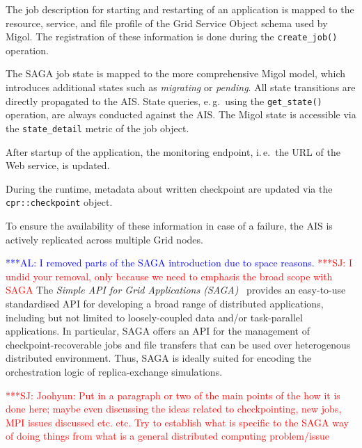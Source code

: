 \documentclass[times, 10pt, twocolumn]{article}
\newcommand{\alnote}[1]{ {\textcolor{blue} { ***AL: #1 }}}
\newcommand{\jhanote}[1]{ {\textcolor{red} { ***SJ: #1 }}}
\newcommand{\alnote}[1]{}
\newcommand{\jhanote}[1]{}
\newcommand{\up}{\vspace*{-1em}}
\begin{document}
\begin{compactitem}
\item The job description for starting and restarting of an
  application is mapped to the resource, service, and file profile of
  the Grid Service Object schema used by Migol. The registration of
  these information is done during the \texttt{create\_job()}
  operation.
\item The SAGA job state is mapped to the more comprehensive Migol
  model, which introduces additional states such as \emph{migrating}
  or \emph{pending}. All state transitions are directly propagated to
  the AIS. State queries, e.\,g.\ using the \texttt{get\_state()}
  operation, are always conducted against the AIS. The Migol state is
  accessible via the \texttt{state\_detail} metric of the job object.
\item After startup of the application, the monitoring endpoint,
  i.\,e.\ the URL of the Web service, is updated.
\item During the runtime, metadata about written checkpoint are 
  updated via the \texttt{cpr::checkpoint} object.
\end{compactitem}   
To ensure the availability of these information in case of a failure,
the AIS is actively replicated across multiple Grid nodes.




\up \alnote{I removed parts of the SAGA introduction due to space
  reasons.}  \jhanote{I undid your removal, only because we need to
  emphasis the broad scope with SAGA} The \emph{Simple API for Grid
  Applications (SAGA)}~\cite{saga_gfd90} provides an easy-to-use
standardised API for developing a broad range of distributed
applications, including but not limited to loosely-coupled data and/or
task-parallel applications.  %
In particular, SAGA offers an API for the management of
checkpoint-recoverable jobs and file transfers that can be used over
heterogenous distributed environment. Thus, SAGA is ideally suited for
encoding the orchestration logic of replica-exchange simulations.

\jhanote{Joohyun: Put in a paragraph or two of the main points of the
  how it is done here; maybe even discussing the ideas related to
  checkpointing, new jobs, MPI issues discussed etc. etc. Try to
  establish what is specific to the SAGA way of doing things from what
  is a general distributed computing problem/issue}
\end{document}
